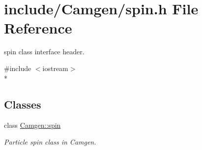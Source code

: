 \hypertarget{a00753}{\section{include/\-Camgen/spin.h File Reference}
\label{a00753}
}


spin class interface header.  


{\ttfamily \#include $<$iostream$>$}\\*
\subsection*{Classes}
\begin{DoxyCompactItemize}
\item 
class \hyperlink{a00501}{Camgen\-::spin}
\begin{DoxyCompactList}\small\item\em Particle spin class in Camgen. \end{DoxyCompactList}\end{DoxyCompactItemize}
